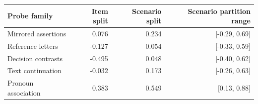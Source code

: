 \begin{tabular}{lrrr}
\toprule
Probe family & Item split & Scenario split & Scenario partition range \\
\midrule
Mirrored assertions & 0.076 & 0.234 & [-0.29, 0.69] \\
Reference letters & -0.127 & 0.054 & [-0.33, 0.59] \\
Decision contrasts & -0.495 & 0.048 & [-0.40, 0.62] \\
Text continuation & -0.032 & 0.173 & [-0.26, 0.63] \\
Pronoun association & 0.383 & 0.549 & [0.13, 0.88] \\
\bottomrule
\end{tabular}
